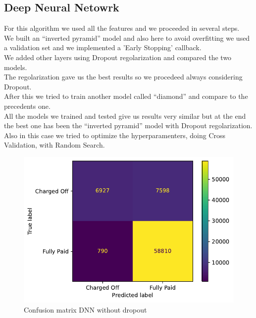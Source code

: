\documentclass[french]{scrartcl}
\begin{document}
\subsection{Deep Neural Netowrk}
For this algorithm we used all the features and we proceeded in several steps.\\
We built an “inverted pyramid” model and also here to avoid overfitting we used a validation set and we implemented a ’Early Stopping’ callback. \\
We added other layers using Dropout regolarization and compared the two models.\\
The regolarization gave us the best results so we procedeed always considering Dropout.\\
After this we tried to train another model called “diamond” and compare to the precedents one. \\
All the models we trained and tested give us results very similar but at the end the best one has been the “inverted pyramid” model with Dropout regolarization.\\
Also in this case we tried to optimize the hyperparamenters, doing Cross Validation, with Random Search. 
	\begin{figure}[h!]
	\centering
	\includegraphics[scale=0.8]{figures/(7)confusion_matrix_basic_neural_network.pdf}
	\caption{Confusion matrix DNN without dropout}
\end{figure}
\end{document}
